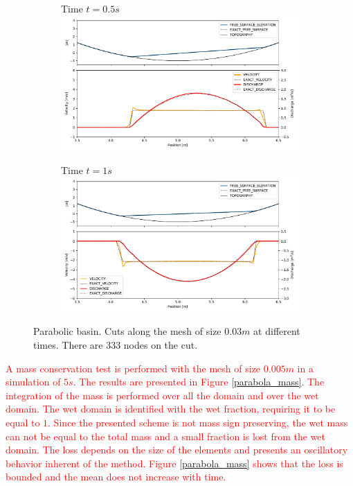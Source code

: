 \documentclass[a4paper,12pt]{elsarticle}
\newcommand{\Miguel}[1]{\textcolor{red}{#1}}
\begin{document}
\begin{figure}[H]
\begin{subfigure}{\textwidth}
    \centering
    Time $t=0.5s$
    \includegraphics[width=\textwidth]{img/par/parabola_t0.5.pdf}
\end{subfigure}
\par\medskip
\begin{subfigure}{\textwidth}
    \centering
    Time $t=1s$
    \includegraphics[width=\textwidth]{img/par/parabola_t1.0.pdf}
\end{subfigure}
\caption{Parabolic basin. Cuts along the mesh of size $0.03m$ at different times. There are 333 nodes on the cut.}
\label{parabola_graphic}
\end{figure}

\Miguel{
A mass conservation test is performed with the mesh of size $0.005m$ in a simulation of $5s$. The results are presented in Figure \ref{parabola_mass}. The integration of the mass is performed over all the domain and over the wet domain. The wet domain is identified with the wet fraction, requiring it to be equal to $1$. Since the presented scheme is not mass sign preserving, the wet mass can not be equal to the total mass and a small fraction is lost from the wet domain. The loss depends on the size of the elements and presents an oscillatory behavior inherent of the method. Figure \ref{parabola_mass} shows that the loss is bounded and the mean does not increase with time.
}
\end{document}
